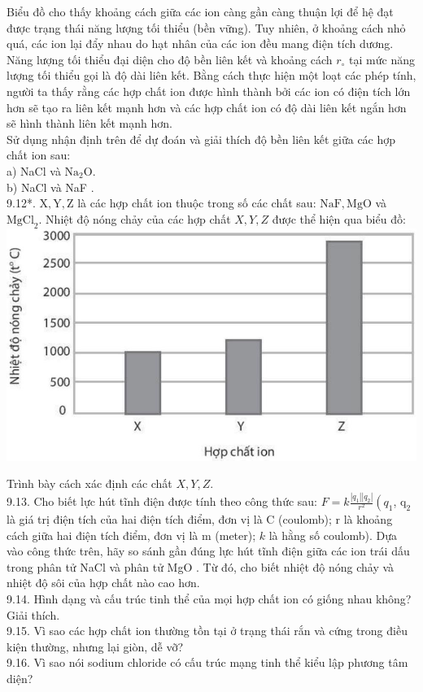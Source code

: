\documentclass[10pt]{article}
\begin{document}
Biểu đồ cho thấy khoảng cách giữa các ion càng gần càng thuận lợi để hệ đạt được trạng thái năng lượng tối thiểu (bền vững). Tuy nhiên, ở khoảng cách nhỏ quá, các ion lại đẩy nhau do hạt nhân của các ion đều mang điện tích dương.\\
Năng lượng tối thiểu đại diện cho độ bền liên kết và khoảng cách $r_{\circ}$ tại mức năng lượng tối thiểu gọi là độ dài liên kết. Bằng cách thực hiện một loạt các phép tính, người ta thấy rằng các hợp chất ion được hình thành bởi các ion có điện tích lớn hơn sẽ tạo ra liên kết mạnh hơn và các hợp chất ion có độ dài liên kết ngắn hơn sẽ hình thành liên kết mạnh hơn.\\
Sử dụng nhận định trên để dự đoán và giải thích độ bền liên kết giữa các hợp chất ion sau:\\
a) NaCl và $\mathrm{Na}_{2} \mathrm{O}$.\\
b) NaCl và NaF .\\
9.12*. $\mathrm{X}, \mathrm{Y}, \mathrm{Z}$ là các hợp chất ion thuộc trong số các chất sau: $\mathrm{NaF}, \mathrm{MgO}$ và $\mathrm{MgCl}_{2}$. Nhiệt độ nóng chảy của các hợp chất $X, Y, Z$ được thể hiện qua biểu đồ:\\
\includegraphics[max width=\textwidth, center]{2025_10_23_883c4b146e2332109fcdg-28}

Trình bày cách xác định các chất $X, Y, Z$.\\
9.13. Cho biết lực hút tĩnh điện được tính theo công thức sau: $F=k \frac{\left|q_{1}\right|\left|q_{2}\right|}{r^{2}}\left(q_{1}\right.$, $\mathrm{q}_{2}$ là giá trị điện tích của hai điện tích điểm, đơn vị là C (coulomb); r là khoảng cách giữa hai điện tích điểm, đơn vị là m (meter); $k$ là hằng số coulomb). Dựa vào công thức trên, hãy so sánh gần đúng lực hút tĩnh điện giữa các ion trái dấu trong phân tử NaCl và phân tử MgO . Từ đó, cho biết nhiệt độ nóng chảy và nhiệt độ sôi của hợp chất nào cao hơn.\\
9.14. Hình dạng và cấu trúc tinh thể của mọi hợp chất ion có giống nhau không? Giải thích.\\
9.15. Vì sao các hợp chất ion thường tồn tại ở trạng thái rắn và cứng trong điều kiện thường, nhưng lại giòn, dễ vỡ?\\
9.16. Vì sao nói sodium chloride có cấu trúc mạng tinh thể kiểu lập phương tâm diện?
\end{document}
